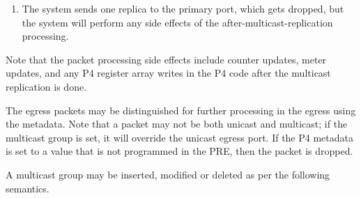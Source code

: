 \documentclass[11pt]{article}
\begin{document}
{\begin{enumerate}
\item{}
The system sends one replica to the primary port, which gets dropped,
but the system will perform any side effects of the
after-multicast-replication processing.%
\end{enumerate}%

\noindent{}Note that the packet processing side effects include counter updates, meter
updates, and any P4 register array writes in the P4 code after the multicast
replication is done.%

The egress packets may be distinguished for further processing in the egress
using the  metadata. Note that a packet may not be both unicast and
multicast; if the multicast group is set, it will override the unicast egress
port. If the P4  metadata is set to a value that is not
programmed in the PRE, then the packet is dropped.%

A multicast group may be inserted, modified or deleted as per the following
semantics.%

\begin{itemize}[noitemsep,topsep=\mdcompacttopsep]%


\end{itemize}}
\end{document}
